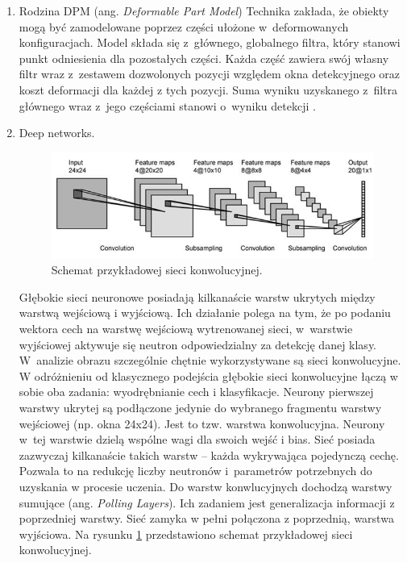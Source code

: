 \begin{enumerate}
\item Rodzina DPM (ang. \textit{Deformable Part Model})
%
Technika zakłada, że obiekty mogą być zamodelowane poprzez części ułożone w~deformowanych konfiguracjach. 
Model składa się z~głównego, globalnego filtra, który stanowi punkt odniesienia dla pozostałych części. 
Każda część zawiera swój własny filtr wraz z~zestawem dozwolonych pozycji względem okna detekcyjnego oraz koszt deformacji dla każdej z tych pozycji. 
Suma wyniku uzyskanego z~filtra głównego wraz z~jego częściami stanowi o~wyniku detekcji \cite{felzenszwalb2008discriminatively}.

\item Deep networks.

\begin{figure}
\centering
\includegraphics[width=0.5\linewidth]{images/DNN}
\caption[IntegralImage.]{Schemat przykładowej sieci konwolucyjnej.}
\label{fig:DNN}
\end{figure}

Głębokie sieci neuronowe posiadają kilkanaście warstw ukrytych między warstwą wejściową i wyjściową. 
Ich działanie polega na tym, że po podaniu wektora cech na warstwę wejściową wytrenowanej sieci, w~warstwie wyjściowej aktywuje się neutron odpowiedzialny za detekcję danej klasy. 
W~analizie obrazu szczególnie chętnie wykorzystywane są sieci konwolucyjne. W odróżnieniu od klasycznego podejścia głębokie sieci konwolucyjne łączą w sobie oba zadania: wyodrębnianie cech i klasyfikacje.
Neurony pierwszej warstwy ukrytej są podłączone jedynie do wybranego fragmentu warstwy wejściowej (np. okna 24x24). %
Jest to tzw. warstwa konwolucyjna. 
Neurony w~tej warstwie dzielą wspólne wagi dla swoich wejść i bias. 
Sieć posiada zazwyczaj kilkanaście takich warstw -- każda wykrywająca pojedynczą cechę. 
Pozwala to na redukcję liczby neutronów i~parametrów potrzebnych do uzyskania w procesie uczenia. 
Do warstw konwlucyjnych dochodzą warstwy sumujące (ang. \textit{Polling Layers}). 
Ich zadaniem jest generalizacja informacji z poprzedniej warstwy. 
Sieć zamyka w pełni połączona z poprzednią, warstwa wyjściowa. Na rysunku \ref{fig:DNN} przedstawiono schemat przykładowej sieci konwolucyjnej.


\end{enumerate}
